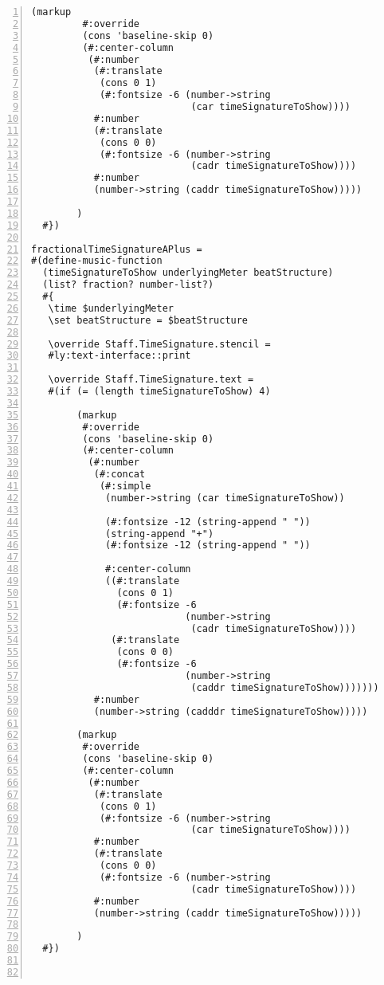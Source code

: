 \begin{Verbatim}[numbers=left,xleftmargin=5mm]
        (markup
         #:override
         (cons 'baseline-skip 0)
         (#:center-column
          (#:number
           (#:translate
            (cons 0 1)
            (#:fontsize -6 (number->string
                            (car timeSignatureToShow))))
           #:number
           (#:translate
            (cons 0 0)
            (#:fontsize -6 (number->string
                            (cadr timeSignatureToShow))))
           #:number
           (number->string (caddr timeSignatureToShow)))))

        )
  #})

fractionalTimeSignatureAPlus =
#(define-music-function
  (timeSignatureToShow underlyingMeter beatStructure)
  (list? fraction? number-list?)
  #{
   \time $underlyingMeter
   \set beatStructure = $beatStructure

   \override Staff.TimeSignature.stencil =
   #ly:text-interface::print

   \override Staff.TimeSignature.text =
   #(if (= (length timeSignatureToShow) 4)

        (markup
         #:override
         (cons 'baseline-skip 0)
         (#:center-column
          (#:number
           (#:concat
            (#:simple
             (number->string (car timeSignatureToShow))

             (#:fontsize -12 (string-append " "))
             (string-append "+")
             (#:fontsize -12 (string-append " "))

             #:center-column
             ((#:translate
               (cons 0 1)
               (#:fontsize -6
                           (number->string
                            (cadr timeSignatureToShow))))
              (#:translate
               (cons 0 0)
               (#:fontsize -6
                           (number->string
                            (caddr timeSignatureToShow)))))))
           #:number
           (number->string (cadddr timeSignatureToShow)))))

        (markup
         #:override
         (cons 'baseline-skip 0)
         (#:center-column
          (#:number
           (#:translate
            (cons 0 1)
            (#:fontsize -6 (number->string
                            (car timeSignatureToShow))))
           #:number
           (#:translate
            (cons 0 0)
            (#:fontsize -6 (number->string
                            (cadr timeSignatureToShow))))
           #:number
           (number->string (caddr timeSignatureToShow)))))

        )
  #})



\end{Verbatim}
